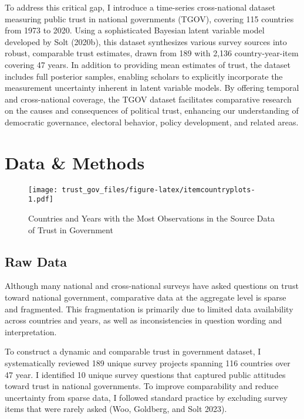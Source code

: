 \documentclass[
  12pt,
]{article}
\begin{document}
To address this critical gap, I introduce a time-series cross-national dataset measuring public trust in national governments (TGOV), covering 115 countries from 1973 to 2020.
Using a sophisticated Bayesian latent variable model developed by Solt (2020b), this dataset synthesizes various survey sources into robust, comparable trust estimates, drawn from 189 with 2,136 country-year-item covering 47 years.
In addition to providing mean estimates of trust, the dataset includes full posterior samples, enabling scholars to explicitly incorporate the measurement uncertainty inherent in latent variable models.
By offering temporal and cross-national coverage, the TGOV dataset facilitates comparative research on the causes and consequences of political trust, enhancing our understanding of democratic governance, electoral behavior, policy development, and related areas.

\section{Data \& Methods}\label{data-methods}

\begin{figure}
\centering
\texttt{[image: trust\_gov\_files/figure-latex/itemcountryplots-1.pdf]}
\caption{\label{fig:itemcountryplots}Countries and Years with the Most Observations in the Source Data of Trust in Government \label{tgov_item_country_plots}}
\end{figure}

\subsection{Raw Data}\label{raw-data}

Although many national and cross-national surveys have asked questions on trust toward national government, comparative data at the aggregate level is sparse and fragmented.
This fragmentation is primarily due to limited data availability across countries and years, as well as inconsistencies in question wording and interpretation.

To construct a dynamic and comparable trust in government dataset, I systematically reviewed 189 unique survey projects spanning 116 countries over 47 year.
I identified 10 unique survey questions that captured public attitudes toward trust in national governments.
To improve comparability and reduce uncertainty from sparse data, I followed standard practice by excluding survey items that were rarely asked (Woo, Goldberg, and Solt 2023).
\end{document}
